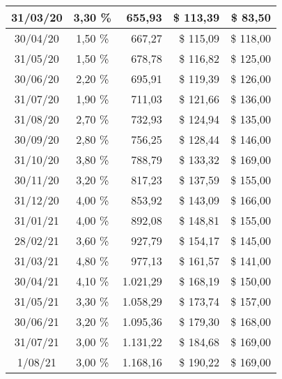 \begin{longtable}{|c|c|r|r|r|}
31/03/20 & 3,30 \% & 655,93 & \$ 113,39 & \$ 83,50 \\ \hline
30/04/20 & 1,50 \% & 667,27 & \$ 115,09 & \$ 118,00 \\ \hline
31/05/20 & 1,50 \% & 678,78 & \$ 116,82 & \$ 125,00 \\ \hline
30/06/20 & 2,20 \% & 695,91 & \$ 119,39 & \$ 126,00 \\ \hline
31/07/20 & 1,90 \% & 711,03 & \$ 121,66 & \$ 136,00 \\ \hline
31/08/20 & 2,70 \% & 732,93 & \$ 124,94 & \$ 135,00 \\ \hline
30/09/20 & 2,80 \% & 756,25 & \$ 128,44 & \$ 146,00 \\ \hline
31/10/20 & 3,80 \% & 788,79 & \$ 133,32 & \$ 169,00 \\ \hline
30/11/20 & 3,20 \% & 817,23 & \$ 137,59 & \$ 155,00 \\ \hline
31/12/20 & 4,00 \% & 853,92 & \$ 143,09 & \$ 166,00 \\ \hline
31/01/21 & 4,00 \% & 892,08 & \$ 148,81 & \$ 155,00 \\ \hline
28/02/21 & 3,60 \% & 927,79 & \$ 154,17 & \$ 145,00 \\ \hline
31/03/21 & 4,80 \% & 977,13 & \$ 161,57 & \$ 141,00 \\ \hline
30/04/21 & 4,10 \% & 1.021,29 & \$ 168,19 & \$ 150,00 \\ \hline
31/05/21 & 3,30 \% & 1.058,29 & \$ 173,74 & \$ 157,00 \\ \hline
30/06/21 & 3,20 \% & 1.095,36 & \$ 179,30 & \$ 168,00 \\ \hline
31/07/21 & 3,00 \% & 1.131,22 & \$ 184,68 & \$ 169,00 \\ \hline
1/08/21 & 3,00 \% & 1.168,16 & \$ 190,22 & \$ 169,00 \\ \hline
\end{longtable}
